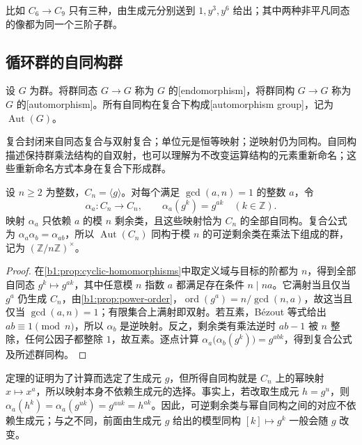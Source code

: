 比如 \(C_6\rightarrow C_9\) 只有三种，由生成元分别送到 \(1,y^3,y^6\) 给出；其中两种非平凡同态的像都为同一个三阶子群。

\subsection{循环群的自同构群}
\label{b1:subsec:0301:03}

\begin{definition}\label{b1:def:automorphism}
	设 \(G\) 为群。将群同态 \(G\rightarrow G\) 称为 \(G\) 的[endomorphism]，将群同构 \(G\rightarrow G\) 称为 \(G\) 的[automorphism]。所有自同构在复合下构成[automorphism group]，记为 \(\operatorname{Aut}(G)\)。
\end{definition}

复合封闭来自同态复合与双射复合；单位元是恒等映射；逆映射仍为同构。自同构描述保持群乘法结构的自双射，也可以理解为不改变运算结构的元素重新命名；这些重新命名方式本身在复合下形成群。

\begin{theorem}[循环群的自同构]\label{b1:thm:cyclic-automorphisms}
	设 \(n\geq2\) 为整数，\(C_n=\langle g\rangle\)。对每个满足 \(\gcd(a,n)=1\) 的整数 \(a\)，令
	\[
		\alpha_a:C_n\longrightarrow C_n,\qquad \alpha_a(g^k)=g^{ak}\quad(k\in\mathbb Z).
	\]
	映射 \(\alpha_a\) 只依赖 \(a\) 的模 \(n\) 剩余类，且这些映射恰为 \(C_n\) 的全部自同构。复合公式为 \(\alpha_a\alpha_b=\alpha_{ab}\)，所以 \(\operatorname{Aut}(C_n)\) 同构于模 \(n\) 的可逆剩余类在乘法下组成的群，记为 \((\mathbb Z/n\mathbb Z)^\times\)。
\end{theorem}
\begin{proof}
	在\cref{b1:prop:cyclic-homomorphisms}中取定义域与目标的阶都为 \(n\)，得到全部自同态 \(g^k\mapsto g^{ak}\)，其中任意模 \(n\) 指数 \(a\) 都满足存在条件 \(n\mid na\)。它满射当且仅当 \(g^a\) 仍生成 \(C_n\)，由\cref{b1:prop:power-order}，\(\operatorname{ord}(g^a)=n/\gcd(n,a)\)，故这当且仅当 \(\gcd(a,n)=1\)；有限集合上满射即双射。若互素，Bézout 等式给出 \(ab\equiv1\pmod n\)，所以 \(\alpha_b\) 是逆映射。反之，剩余类有乘法逆时 \(ab-1\) 被 \(n\) 整除，任何公因子都整除 \(1\)，故互素。逐点计算 \(\alpha_a\bigl(\alpha_b(g^k)\bigr)=g^{abk}\)，得到复合公式及所述群同构。
\end{proof}

定理的证明为了计算而选定了生成元 \(g\)，但所得自同构就是 \(C_n\) 上的幂映射 \(x\mapsto x^a\)，所以映射本身不依赖生成元的选择。事实上，若改取生成元 \(h=g^u\)，则 \(\alpha_a(h^k)=\alpha_a(g^{uk})=g^{auk}=h^{ak}\)。因此，可逆剩余类与幂自同构之间的对应不依赖生成元；与之不同，前面由生成元 \(g\) 给出的模型同构 \([k]\mapsto g^k\) 一般会随 \(g\) 改变。

